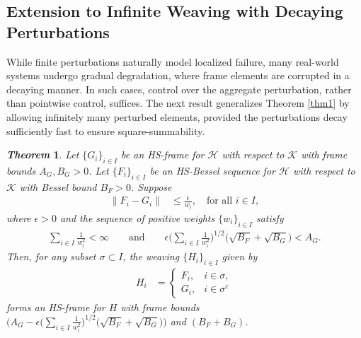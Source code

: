 \documentclass[reqno]{amsart}
\theoremstyle{plain}
\newtheorem{thm}{\it Theorem}[section]
\theoremstyle{remark}
\numberwithin{equation}{section}
\begin{document}
\subsection{Extension to Infinite Weaving with Decaying Perturbations}
While finite perturbations naturally model localized failure, many real-world systems undergo gradual degradation, where frame elements are corrupted in a decaying manner. In such cases, control over the aggregate perturbation, rather than pointwise control, suffices. The next result generalizes Theorem \ref{thm1} by allowing infinitely many perturbed elements, provided the perturbations decay sufficiently fast to ensure square-summability.
\begin{thm}\label{thm3}
Let $\{G_i\}_{i \in I}$ be an HS-frame for $\mathcal{H}$  with respect to $\mathcal{K}$  with frame bounds $A_G, B_G > 0$. Let $\{F_i\}_{i \in I}$ be an HS-Bessel sequence for $\mathcal{H}$  with respect to $\mathcal{K}$ with Bessel bound $B_F > 0$. Suppose
\begin{align*}
\|F_i - G_i\| &\leq \frac{\epsilon}{w_i}, \quad \text{for all } i \in I,
\end{align*}
where $\epsilon > 0$ and the sequence of positive weights $\{w_i\}_{i \in I}$ satisfy
\begin{align*}
\sum_{i \in I} \frac{1}{w_i^2} < \infty  \quad \quad \text{and} \quad \quad  \epsilon \Big(\sum_{i \in I} \frac{1}{w_i^2}\Big)^{1/2}\big(\sqrt{B_F}+ \sqrt{B_G}\big) < A_G.
\end{align*}
Then, for any subset $\sigma \subset I$, the weaving $\{H_i\}_{i \in I}$ given by
\begin{align}\label{defse1}
    H_i &= \begin{cases}
    F_i, & i \in \sigma,\\
    G_i, & i \in \sigma^c
    \end{cases}
\end{align}
forms an HS-frame for $H$ with frame bounds
$\big(A_G - \epsilon \big(\sum_{i \in I} \frac{1}{w_i^2}\big)^{1/2}\big(\sqrt{B_F}+ \sqrt{B_G}\big)\big)$ and $(B_F + B_G)$.
\end{thm}
\end{document}
